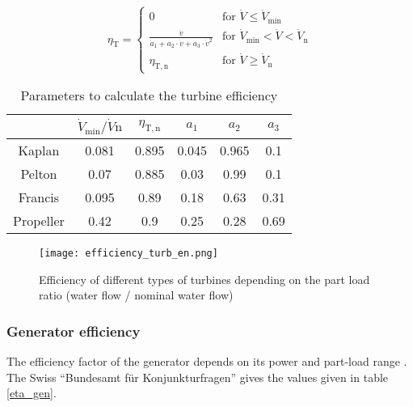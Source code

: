 \begin{equation}
 \label{eq_eff}
\eta_\mathrm{T}= \left\{
    \begin{array}{ll}
	0 & \mbox{for } \dot{V} \leq \dot{V}_\mathrm{min}\\
        \frac{\dot{v}}{a_\mathrm{1}+a_\mathrm{2} \cdot \dot{v} + a_\mathrm{3} \cdot \dot{v}^2} & \mbox{for } \dot{V}_\mathrm{min}<\dot{V}<\dot{V}_\mathrm{n} \\
        \eta_\mathrm{T,n} & \mbox{for } \dot{V} \geq \dot{V}_\mathrm{n}
    \end{array}
\right.
\end{equation}


\begin{table}[H]
 \centering
 \caption[Parameters to calculate the turbine efficiency]{Parameters to calculate the turbine efficiency \cite{quaschning}}
 \footnotesize
 \label{eff_param}
 \begin{tabular}{|c|c|c|c|c|c|}
  \cline{2-6}
  \multicolumn{1}{c|}{}&$\dot{V}_\mathrm{min} / \dot{V}\mathrm{n}$ & $\eta_\mathrm{T,n}$& $a_\mathrm{1}$ & $a_\mathrm{2}$&$a_\mathrm{3}$ \\ 
  \hline
  Kaplan & 0.081& 0.895& 0.045 &0.965& 0.1 \\
  Pelton & 0.07& 0.885& 0.03& 0.99& 0.1\\
  Francis &0.095 &0.89 &0.18 &0.63 &0.31 \\
  Propeller &0.42 &0.9 &0.25 &0.28 &0.69\\
  \hline
 \end{tabular}
\end{table}

\begin{figure}[H]
\centering
\texttt{[image: efficiency\_turb\_en.png]}
\caption[Efficiency of different types of turbines depending on the part load ratio]{Efficiency of different types of turbines depending on the part load ratio (water flow / nominal water flow) \cite{raa89}}
\label{efficiency_turb}
\end{figure}

\subsubsection{Generator efficiency}

The efficiency factor of the generator depends on its power and part-load range \cite{pacer}. The Swiss ``Bundesamt für Konjunkturfragen'' gives the values given in table \ref{eta_gen}.

